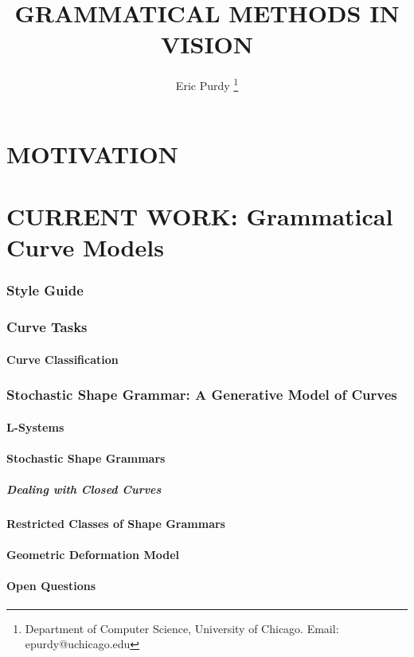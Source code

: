 \documentclass{article}
\title{GRAMMATICAL METHODS IN VISION}
\author{Eric Purdy \footnote{Department of Computer Science,
    University of Chicago. Email: epurdy@uchicago.edu}}
\begin{document}
\maketitle

\tableofcontents

\part{MOTIVATION}

\part{CURRENT WORK: Grammatical Curve Models}
\section{Style Guide}
\section{Curve Tasks}
  \subsection{Curve Classification}
\section{Stochastic Shape Grammar: A Generative Model of Curves}
  \subsection{L-Systems}
  \subsection{Stochastic Shape Grammars}
    \subsubsection{Dealing with Closed Curves}
  \subsection{Restricted Classes of Shape Grammars}
  \subsection{Geometric Deformation Model}
  \subsection{Open Questions}
\end{document}
